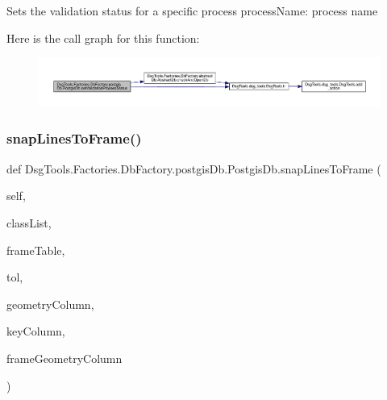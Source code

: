 \begin{DoxyVerb}Sets the validation status for a specific process
processName: process name
\end{DoxyVerb}
 Here is the call graph for this function\+:
\nopagebreak
\begin{figure}[H]
\begin{center}
\leavevmode
\includegraphics[width=350pt]{class_dsg_tools_1_1_factories_1_1_db_factory_1_1postgis_db_1_1_postgis_db_afdd4d6d2db4d633abeea3d6c977c56b7_cgraph}
\end{center}
\end{figure}
\mbox{\label{class_dsg_tools_1_1_factories_1_1_db_factory_1_1postgis_db_1_1_postgis_db_a014921474a7fa941678e6cf0b5ebc865}} 
\subsubsection{\texorpdfstring{snap\+Lines\+To\+Frame()}{snapLinesToFrame()}}
{\footnotesize\ttfamily def Dsg\+Tools.\+Factories.\+Db\+Factory.\+postgis\+Db.\+Postgis\+Db.\+snap\+Lines\+To\+Frame (\begin{DoxyParamCaption}\item[{}]{self,  }\item[{}]{class\+List,  }\item[{}]{frame\+Table,  }\item[{}]{tol,  }\item[{}]{geometry\+Column,  }\item[{}]{key\+Column,  }\item[{}]{frame\+Geometry\+Column }\end{DoxyParamCaption})}

